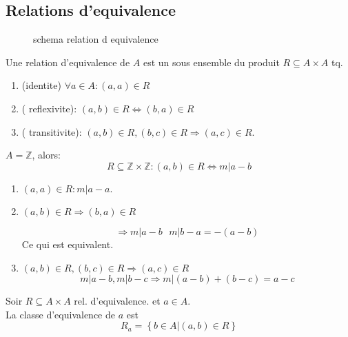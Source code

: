 \documentclass[../main.tex]{subfiles}
\begin{document}
\subsection{Relations d'equivalence}
\begin{figure}[H]
    \centering
    \caption{schema relation d equivalence}
    \label{fig:schema-relation-d-equivalence}
\end{figure}
\begin{defn}\label{defn:relations_d_equivalence}
	Une relation d'equivalence de $A$ est un sous ensemble du produit $R \subseteq A \times A$ tq.
	\begin{enumerate}
		\item (identite) $\forall a \in A: ( a,a) \in R	$\\
		\item ( reflexivite): $(a,b) \in R \iff ( b,a) \in R$ \\
		\item ( transitivite): $(a,b) \in R, ( b,c) \in R \Rightarrow ( a,c)\in R$.
	\end{enumerate}
\end{defn}
\begin{exemple}
$A= \mathbb{Z}$, alors:
\[ 
	R \subseteq \mathbb{Z}\times \mathbb{Z}: ( a,b) \in R \iff m \vert a-b
\]
\begin{enumerate}
	\item $(a,a) \in R: m \vert a-a$.\\
	\item $( a,b) \in R \Rightarrow ( b,a) \in R$

		\[ 
			\Rightarrow m \vert a-b \text{  } m \vert b-a = -(a-b)
		\]
	Ce qui est equivalent.\\
\item $(a,b) \in R, ( b,c) \in R \Rightarrow ( a,c) \in R$\\
	\[ 
		m \vert a-b , m | b-c \Rightarrow m \vert ( a-b)+ ( b-c) = a-c
	\]
	
\end{enumerate}
\end{exemple}
\begin{defn}\label{defn:classes_d_equivalence}
	Soir $R \subseteq A \times A$ rel. d'equivalence. et $a \in A$.\\
	La classe d'equivalence de $a$ est
	\[ 
		R_a= \left\{ b \in A \vert ( a,b) \in R \right\} 
	\]
\end{defn}
\end{document}

